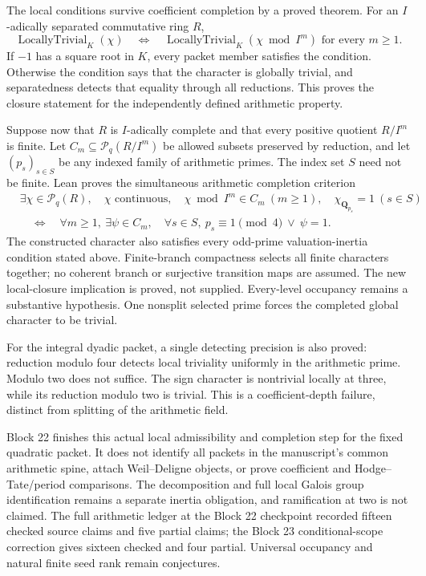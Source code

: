\documentclass[11pt]{article}
\theoremstyle{definition}
\theoremstyle{remark}
\newcommand{\Q}{\mathbf Q}
\begin{document}
The local conditions survive coefficient completion by a proved theorem.
For an $I$-adically separated commutative ring $R$,
\[
\operatorname{LocallyTrivial}_K(\chi)
\quad\Longleftrightarrow\quad
\operatorname{LocallyTrivial}_K(\chi\bmod I^m)
\text{ for every }m\ge1.
\]
If $-1$ has a square root in $K$, every packet member satisfies the
condition. Otherwise the condition says that the character is globally
trivial, and separatedness detects that equality through all reductions.
This proves the closure statement for the independently defined arithmetic
property.

Suppose now that $R$ is $I$-adically complete and that every positive
quotient $R/I^m$ is finite. Let $C_m\subseteq\mathcal P_q(R/I^m)$ be
allowed subsets preserved by reduction, and let $(p_s)_{s\in S}$ be any
indexed family of arithmetic primes. The index set $S$ need not be finite.
Lean proves the simultaneous arithmetic completion criterion
\[
\begin{split}
&\exists\chi\in\mathcal P_q(R),\quad
 \chi\text{ continuous},\quad
 \chi\bmod I^m\in C_m\ (m\ge1),\quad
 \chi_{\Q_{p_s}}=1\ (s\in S)\\
&\quad\Longleftrightarrow\quad
 \forall m\ge1,\ \exists\psi\in C_m,\quad
 \forall s\in S,\ p_s\equiv1\pmod4\ \lor\ \psi=1.
\end{split}
\]
The constructed character also satisfies every odd-prime valuation-inertia
condition stated above. Finite-branch compactness selects all finite
characters together; no coherent branch or surjective transition maps
are assumed. The new local-closure implication is proved, not supplied.
Every-level occupancy remains a substantive hypothesis. One nonsplit
selected prime forces the completed global character to be trivial.

For the integral dyadic packet, a single detecting precision is also
proved: reduction modulo four detects local triviality uniformly in the
arithmetic prime. Modulo two does not suffice. The sign character is
nontrivial locally at three, while its reduction modulo two is trivial.
This is a coefficient-depth failure, distinct from splitting of the
arithmetic field.

Block 22 finishes this actual local admissibility and completion step for
the fixed quadratic packet. It does not identify all packets in the
manuscript's common arithmetic spine, attach Weil--Deligne objects, or
prove coefficient and Hodge--Tate/period comparisons. The decomposition
and full local Galois group identification remains a separate inertia
obligation, and ramification at two is not claimed. The full arithmetic
ledger at the Block 22 checkpoint recorded fifteen checked source claims
and five partial claims; the Block 23 conditional-scope correction gives
sixteen checked and four partial.
Universal occupancy and natural finite seed rank remain conjectures.
\end{document}
